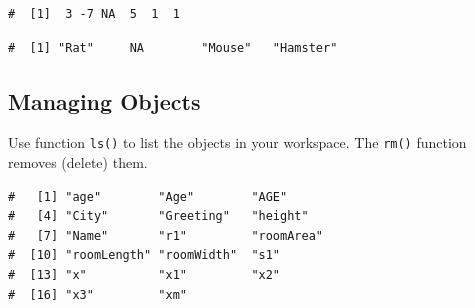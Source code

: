 \documentclass[a4paper,9pt,twocolumn,twoside,printwatermark=false]{pinp}
\begin{document}
\begin{ShadedResult}
\begin{verbatim}
#  [1]  3 -7 NA  5  1  1
\end{verbatim}
\end{ShadedResult}

\begin{Shaded}
\begin{Highlighting}[]
\StringTok{ }\NormalTok{(}\NormalTok{, }\NormalTok{, }\NormalTok{, }\NormalTok{)}
\end{Highlighting}
\end{Shaded}

\begin{ShadedResult}
\begin{verbatim}
#  [1] "Rat"     NA        "Mouse"   "Hamster"
\end{verbatim}
\end{ShadedResult}

\subsection{Managing Objects}\label{managing-objects}

Use function \texttt{ls()} to list the objects in your workspace. The
\texttt{rm()} function removes (delete) them.

\begin{Shaded}
\begin{Highlighting}[]
\NormalTok{()}
\end{Highlighting}
\end{Shaded}

\begin{ShadedResult}
\begin{verbatim}
#   [1] "age"        "Age"        "AGE"       
#   [4] "City"       "Greeting"   "height"    
#   [7] "Name"       "r1"         "roomArea"  
#  [10] "roomLength" "roomWidth"  "s1"        
#  [13] "x"          "x1"         "x2"        
#  [16] "x3"         "xm"
\end{verbatim}
\end{ShadedResult}

\begin{Shaded}
\begin{Highlighting}[]
\NormalTok{()}
\end{Highlighting}
\end{Shaded}
\end{document}
